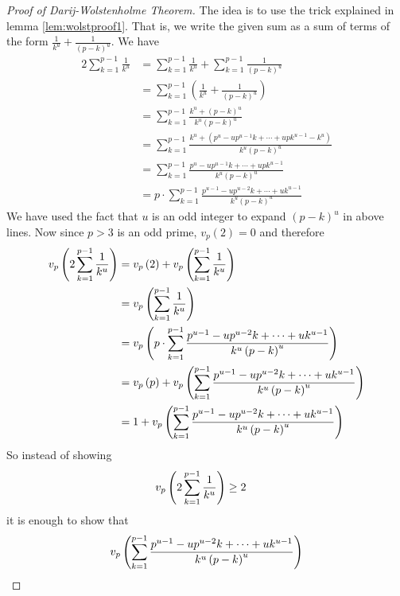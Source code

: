 	\begin{proof}[Proof of Darij-Wolstenholme Theorem]
		The idea is to use the trick explained in lemma \eqref{lem:wolstproof1}. That is, we write the given sum as a sum of terms of the form $\frac{1}{k^u}+\frac{1}{(p-k)^u}$. We have
		\begin{align*}
			2\sum_{k = 1}^{p - 1}\frac {1}{k^{u}}
				&= \sum_{k = 1}^{p - 1}\frac {1}{k^{u}} + \sum_{k = 1}^{p - 1}\frac {1}{\left(p - k\right)^{u}}\\
				&= \sum_{k = 1}^{p - 1}\left(\frac {1}{k^{u}} + \frac {1}{\left(p - k\right)^{u}}\right) \\
				&= \sum_{k = 1}^{p - 1}\frac {k^{u} + \left(p - k\right)^{u}}{k^{u}\left(p - k\right)^{u}}\\
				&=\sum_{k = 1}^{p - 1}\frac {k^{u} + \left(p^{u} - up^{u - 1}k+ \cdots + upk^{u - 1} - k^{u}\right)}{k^{u}\left(p - k\right)^{u}} \\
				&= \sum_{k = 1}^{p - 1}\frac {p^{u} - up^{u - 1}k + \cdots + upk^{u - 1}}{k^{u}\left(p - k\right)^{u}}\\
				&=p \cdot \sum_{k = 1}^{p - 1}\frac {p^{u - 1} - up^{u - 2}k+\cdots + uk^{u - 1}}{k^{u}\left(p - k\right)^{u}}
		\end{align*}
		We have used the fact that $u$ is an odd integer to expand $(p-k)^u$ in above lines. Now since $p>3$ is an odd prime, $v_p(2)=0$ and therefore
			\begin{align*}
				v_{p}\left(2\sum_{k = 1}^{p - 1}\frac {1}{k^{u}}\right)
					&= v_{p}\left(2\right) + v_{p}\left(\sum_{k = 1}^{p - 1}\frac {1}{k^{u}}\right)\\
					& = v_{p}\left(\sum_{k = 1}^{p - 1}\frac {1}{k^{u}}\right)\\
					&=v_{p}\left(p \cdot \sum_{k = 1}^{p - 1}\frac {p^{u - 1} - up^{u - 2}k+\cdots + uk^{u - 1}}{k^{u}\left(p-k\right)^{u}}\right)\\
					&=v_{p}\left(p\right) + v_{p}\left(\sum_{k = 1}^{p - 1}\frac {p^{u - 1} - up^{u - 2}k+\cdots + uk^{u - 1}}{k^{u}\left(p-k\right)^{u}}\right)\\
					&=1+v_{p}\left(\sum_{k = 1}^{p - 1}\frac {p^{u - 1} - up^{u - 2}k+\cdots + uk^{u - 1}}{k^{u}\left(p-k\right)^{u}}\right)
			\end{align*}
		So instead of showing
			\begin{align*}
				v_{p}\left(2\sum_{k = 1}^{p - 1}\frac {1}{k^{u}}\right)
					& \geq 2
			\end{align*}
		it is enough to show that
		\begin{align*}
			v_{p}\func{}{\sum_{k = 1}^{p - 1}\frac {p^{u - 1} - up^{u - 2}k+\cdots + uk^{u - 1}}{k^{u}\func{}{p-k}^{u}}}

\end{align*}
\end{proof}
